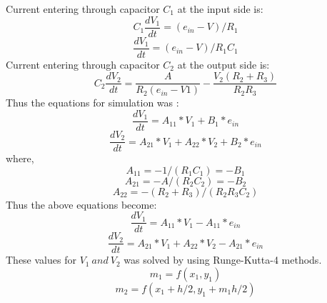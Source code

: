 \documentclass[10pt,journal,cspaper,compsoc]{IEEEtran}
\begin{document}
  Current entering through capacitor \begin{math}
    C_1
  \end{math} at the input side is:
  \begin{equation}
    C_1 \frac{dV_1}{dt} = (e_{in} - V)/R_1
  \end{equation}
  \begin{equation*}
    \frac{dV_1}{dt} = (e_{in}-V)/R_1C_1
  \end{equation*}
  Current entering through capacitor \begin{math}
    C_2
  \end{math} at the output side is:
  \begin{equation}
    C_2 \frac{dV_2}{dt} = \frac{A}{R_2(e_{in}-V1)} - \frac{V_2(R_2+R_3)}{R_2 R_3}
  \end{equation}
  Thus the equations for simulation was :
  \begin{equation}
    \frac{dV_1}{dt} = A_{11} * V_1 + B_1 * e_{in}
  \end{equation}
  \begin{equation}
    \frac{dV_2}{dt} = A_{21} * V_1 + A_{22} * V_2 + B_2 * e_{in}
  \end{equation}
  where,
  \begin{equation*}
    A_{11} = -1/(R_1C_1) = -B_1
  \end{equation*}
  \begin{equation*}
    A_{21} = -A/(R_2C_2) = -B_2
  \end{equation*}
  \begin{equation*}
    A_{22} = - (R_2 + R_3)/(R_2R_3C_2)
  \end{equation*}
  Thus the above equations become:
  \begin{equation}
    \frac{dV_1}{dt} = A_{11} * V_1 - A_{11} * e_{in} \label{eq:l2V1}
  \end{equation}
  \begin{equation}
    \frac{dV_2}{dt} = A_{21} * V_1 + A_{22} * V_2 - A_{21} * e_{in} \label{eq:l2V2}
  \end{equation}
  These values for \begin{math}
    V_1 \ and \ V_2
  \end{math}
  was solved by using Runge-Kutta-4 methods.
  \begin{equation*}
      m_1 = f(x_1,y_1)
  \end{equation*}
  \begin{equation*}
    m_2 = f(x_1 + h/2, y_1 + m_1 h/2)
  \end{equation*}
\end{document}
